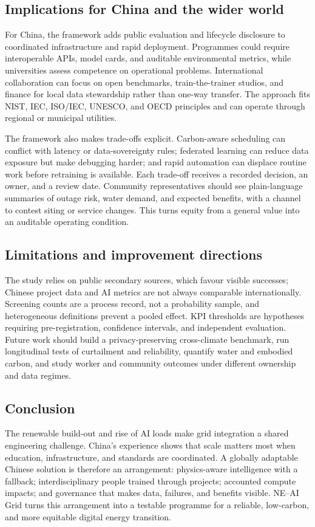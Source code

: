 \documentclass[12pt]{article}
\begin{document}
\subsection{Implications for China and the wider world}
For China, the framework adds public evaluation and lifecycle disclosure to coordinated infrastructure and rapid deployment. Programmes could require interoperable APIs, model cards, and auditable environmental metrics, while universities assess competence on operational problems. International collaboration can focus on open benchmarks, train-the-trainer studios, and finance for local data stewardship rather than one-way transfer. The approach fits NIST, IEC, ISO/IEC, UNESCO, and OECD principles and can operate through regional or municipal utilities.

The framework also makes trade-offs explicit. Carbon-aware scheduling can conflict with latency or data-sovereignty rules; federated learning can reduce data exposure but make debugging harder; and rapid automation can displace routine work before retraining is available. Each trade-off receives a recorded decision, an owner, and a review date. Community representatives should see plain-language summaries of outage risk, water demand, and expected benefits, with a channel to contest siting or service changes. This turns equity from a general value into an auditable operating condition.

\subsection{Limitations and improvement directions}
The study relies on public secondary sources, which favour visible successes; Chinese project data and AI metrics are not always comparable internationally. Screening counts are a process record, not a probability sample, and heterogeneous definitions prevent a pooled effect. KPI thresholds are hypotheses requiring pre-registration, confidence intervals, and independent evaluation. Future work should build a privacy-preserving cross-climate benchmark, run longitudinal tests of curtailment and reliability, quantify water and embodied carbon, and study worker and community outcomes under different ownership and data regimes.

\subsection{Conclusion}
The renewable build-out and rise of AI loads make grid integration a shared engineering challenge. China's experience shows that scale matters most when education, infrastructure, and standards are coordinated. A globally adaptable Chinese solution is therefore an arrangement: physics-aware intelligence with a fallback; interdisciplinary people trained through projects; accounted compute impacts; and governance that makes data, failures, and benefits visible. NE--AI Grid turns this arrangement into a testable programme for a reliable, low-carbon, and more equitable digital energy transition.
\end{document}
